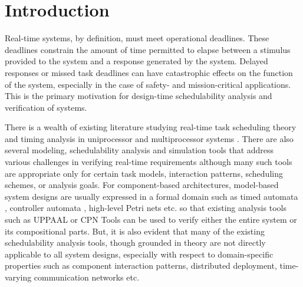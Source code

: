 \section{Introduction}

Real-time systems, by definition, must meet operational deadlines. These deadlines constrain the amount of time permitted to elapse between a stimulus provided to the system and a response generated by the system. Delayed responses or missed task deadlines can have catastrophic effects on the function of the system, especially in the case of safety- and mission-critical applications. This is the primary motivation for design-time schedulability analysis and verification of systems. 

There is a wealth of existing literature studying real-time task scheduling theory and timing analysis in uniprocessor and multiprocessor systems \cite{Audsley1995, Sha2004}. There are also several modeling, schedulability analysis and simulation tools \cite{MAST1, Cheddar, TIMES, PTIDES} that address various challenges in verifying real-time requirements although many such tools are appropriate only for certain task models, interaction patterns, scheduling schemes, or analysis goals. For component-based architectures, model-based system designs are usually expressed in a formal domain such as timed automata \cite{Alur1994, Macariu2010}, controller automata \cite{Zhang2012}, high-level Petri nets \cite{masri2009} etc. so that existing analysis tools such as UPPAAL \cite{UPPAAL} or CPN Tools \cite{CPNTools} can be used to verify either the entire system or its compositional parts. But, it is also evident that many of the existing schedulability analysis tools, though grounded in theory are not directly applicable to all system designs, especially with respect to domain-specific properties such as component interaction patterns, distributed deployment, time-varying communication networks etc. 

